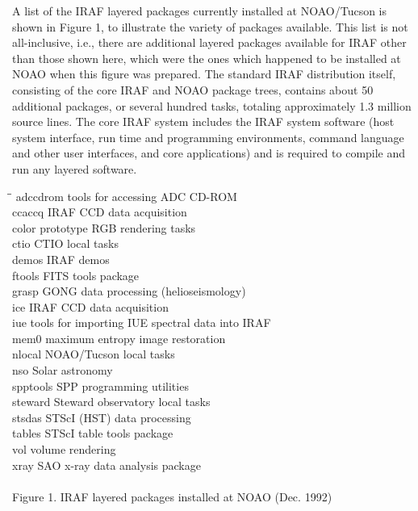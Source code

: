 A list of the IRAF layered packages currently installed at NOAO/Tucson is
shown in Figure 1, to illustrate the variety of packages available.  This
list is not all-inclusive, i.e., there are additional layered packages
available for IRAF other than those shown here, which were the ones which
happened to be installed at NOAO when this figure was prepared.  The
standard IRAF distribution itself, consisting of the core IRAF and NOAO
package trees, contains about 50 additional packages, or several hundred
tasks, totaling approximately 1.3 million source lines.  The core IRAF
system includes the IRAF system software (host system interface, run time
and programming environments, command language and other user interfaces,
and core applications) and is required to compile and run any layered
software.

\small
\begin{tabbing}
\hspace{0.3in}\=\hspace{1.5in}\=\kill
\> adccdrom	\> tools for accessing ADC CD-ROM\\
\> ccaccq	\> IRAF CCD data acquisition\\
\> color	\> prototype RGB rendering tasks\\
\> ctio		\> CTIO local tasks\\
\> demos	\> IRAF demos\\
\> ftools	\> FITS tools package\\
\> grasp	\> GONG data processing (helioseismology)\\
\> ice		\> IRAF CCD data acquisition\\
\> iue		\> tools for importing IUE spectral data into IRAF\\
\> mem0		\> maximum entropy image restoration\\
\> nlocal	\> NOAO/Tucson local tasks\\
\> nso		\> Solar astronomy\\
\> spptools	\> SPP programming utilities\\
\> steward	\> Steward observatory local tasks\\
\> stsdas	\> STScI (HST) data processing\\
\> tables	\> STScI table tools package\\
\> vol		\> volume rendering\\
\> xray		\> SAO x-ray data analysis package\\
\\
\normalsize
\> {Figure 1.} IRAF layered packages installed at NOAO (Dec. 1992)\\
\end{tabbing}
\normalsize
\vskip -12pt

